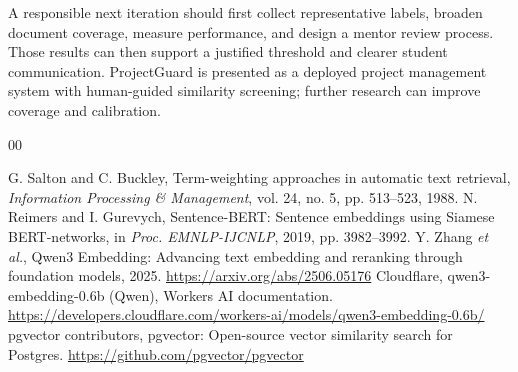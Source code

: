\documentclass[12pt,a4paper]{report}
\begin{document}
A responsible next iteration should first collect representative labels, broaden document coverage, measure performance, and design a mentor review process. Those results can then support a justified threshold and clearer student communication. ProjectGuard is presented as a deployed project management system with human-guided similarity screening; further research can improve coverage and calibration.

\begin{thebibliography}{00}
 G. Salton and C. Buckley, Term-weighting approaches in automatic text retrieval, \emph{Information Processing \& Management}, vol. 24, no. 5, pp. 513--523, 1988.
 N. Reimers and I. Gurevych, Sentence-BERT: Sentence embeddings using Siamese BERT-networks, in \emph{Proc. EMNLP-IJCNLP}, 2019, pp. 3982--3992.
 Y. Zhang \emph{et al.}, Qwen3 Embedding: Advancing text embedding and reranking through foundation models, 2025. \url{https://arxiv.org/abs/2506.05176}
 Cloudflare, qwen3-embedding-0.6b (Qwen), Workers AI documentation. \url{https://developers.cloudflare.com/workers-ai/models/qwen3-embedding-0.6b/}
 pgvector contributors, pgvector: Open-source vector similarity search for Postgres. \url{https://github.com/pgvector/pgvector}
\end{thebibliography}
\end{document}
